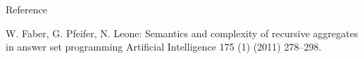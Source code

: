 \documentclass[trans,draft]{beamer} %
\begin{document}
\begin{frame}{Reference}

	\begin{thebibliography}{11}

	\small

	\beamertemplatearticlebibitems
%
%
%
%

		W. Faber, G. Pfeifer, N. Leone:
		\newblock Semantics and complexity of recursive aggregates in answer set programming
		\newblock Artificial Intelligence 175 (1) (2011) 278–298.

	\end{thebibliography}
%
%
%
%
%
%

\end{frame}
\end{document}
